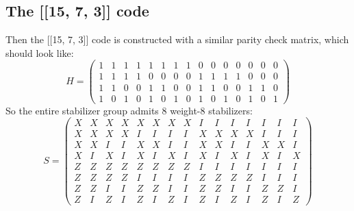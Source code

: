 \documentclass{article}
\begin{document}
\subsection{The [[15, 7, 3]] code}
Then the [[15, 7, 3]] code is constructed with a similar parity check matrix, which should look like:
\[H = \begin{pmatrix}
    1 & 1 & 1 & 1 & 1 & 1 & 1 & 1 & 0 & 0 & 0 & 0 & 0 & 0 & 0 \\
    1 & 1 & 1 & 1 & 0 & 0 & 0 & 0 & 1 & 1 & 1 & 1 & 0 & 0 & 0 \\
    1 & 1 & 0 & 0 & 1 & 1 & 0 & 0 & 1 & 1 & 0 & 0 & 1 & 1 & 0 \\
    1 & 0 & 1 & 0 & 1 & 0 & 1 & 0 & 1 & 0 & 1 & 0 & 1 & 0 & 1
\end{pmatrix}\]
So the entire stabilizer group admits 8 weight-8 stabilizers:
\[S = \begin{pmatrix}
    X & X & X & X & X & X & X & X & I & I & I & I & I & I & I \\
    X & X & X & X & I & I & I & I & X & X & X & X & I & I & I \\
    X & X & I & I & X & X & I & I & X & X & I & I & X & X & I \\
    X & I & X & I & X & I & X & I & X & I & X & I & X & I & X \\
    Z & Z & Z & Z & Z & Z & Z & Z & I & I & I & I & I & I & I \\
    Z & Z & Z & Z & I & I & I & I & Z & Z & Z & Z & I & I & I \\
    Z & Z & I & I & Z & Z & I & I & Z & Z & I & I & Z & Z & I \\
    Z & I & Z & I & Z & I & Z & I & Z & I & Z & I & Z & I & Z
\end{pmatrix}\]
\end{document}
